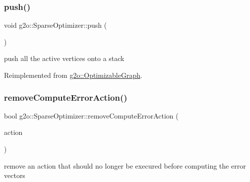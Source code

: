 \mbox{\label{classg2o_1_1_sparse_optimizer_a4c121d69052291775860d06507aba698}} 
\subsubsection{\texorpdfstring{push()}{push()}\hspace{0.1cm}{\footnotesize\ttfamily [3/3]}}
{\footnotesize\ttfamily void g2o\+::\+Sparse\+Optimizer\+::push (\begin{DoxyParamCaption}{ }\end{DoxyParamCaption})\hspace{0.3cm}{\ttfamily [virtual]}}



push all the active vertices onto a stack 



Reimplemented from \mbox{\hyperlink{structg2o_1_1_optimizable_graph_a3db385b25818a5659d1fa8407cb0db45}{g2o\+::\+Optimizable\+Graph}}.

\mbox{\label{classg2o_1_1_sparse_optimizer_aaeb1bffea0c80d98b6650cbf51be2b80}} 
\subsubsection{\texorpdfstring{remove\+Compute\+Error\+Action()}{removeComputeErrorAction()}}
{\footnotesize\ttfamily bool g2o\+::\+Sparse\+Optimizer\+::remove\+Compute\+Error\+Action (\begin{DoxyParamCaption}\item[{\mbox{\hyperlink{classg2o_1_1_hyper_graph_action}{Hyper\+Graph\+Action}} $\ast$}]{action }\end{DoxyParamCaption})}



remove an action that should no longer be execured before computing the error vectors 

\mbox{\label{classg2o_1_1_sparse_optimizer_a0fb2a5e2b250bf2530a600f6dcaad03f}} 
